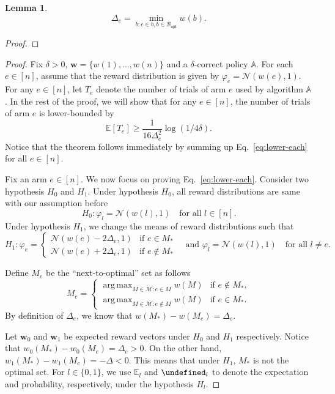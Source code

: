 \documentclass{article}
\newtheorem{lemma}{Lemma}
\newcommand{\Rew}{\varphi}
\newcommand{\E}{\mathbb E}
\newcommand{\M}{\mathcal M}
\newcommand{\Bopt}{\mathcal B_{\mathsf{opt}}}
\DeclareMathOperator*{\argmax}{arg\,max}
\let\Pr\undefined
\DeclareMathOperator{\Pr}{Pr}
\renewcommand{\vec}[1]{\boldsymbol{#1}}
\begin{document}
\begin{spacing}{1.1}
\begin{lemma}
$$
\Delta_e = \min_{b: e \in b, b \in \Bopt} w(b).
$$
\end{lemma}

\begin{proof}
\end{proof}


\begin{proof}
Fix $\delta >0$, $\vec w =\{w(1),\ldots,w(n)\}$ and a $\delta$-correct policy $\mathbb A$.
For each $e\in [n]$, assume that the reward distribution is given by $\Rew_e=\mathcal N(w(e),1)$.
For any $e\in [n]$, let $T_e$ denote the  number of trials of arm $e$ used by algorithm $\mathbb A$.
In the rest of the proof, we will show that for any $e\in [n]$, the number of trials of arm $e$ is lower-bounded by
\begin{equation}
\E[T_e] \ge \frac{1}{16\Delta_e^2}\log(1/4\delta).
\label{eq:lower-each}
\end{equation}
Notice that the theorem follows immediately by summing up Eq.~\eqref{eq:lower-each} for all $e\in[n]$.


Fix an arm $e\in [n]$. We now focus on proving Eq.~\eqref{eq:lower-each}.
Consider two hypothesis $H_0$ and $H_1$. 
Under hypothesis $H_0$, all reward distributions are same with our assumption before
$$
H_0: \Rew_l = \mathcal N(w(l),1) \quad \text{for all } l \in [n].
$$
Under hypothesis $H_1$, we change the means of reward distributions such that 
$$
H_1: 
	\Rew_e = \begin{cases}
	\mathcal N(w(e)-2\Delta_e,1) & \text{if } e\in M_*\\
	\mathcal N(w(e)+2\Delta_e,1) & \text{if } e\not\in M_*
\end{cases} 
\quad\text{and } \Rew_l=\mathcal N(w(l), 1) \quad\text{for all } l\not = e.
$$

Define $M_e$ be the ``next-to-optimal'' set as follows 
$$
M_e = \begin{cases}
		 \argmax_{M\in \M: e \in M} w(M) & \text{if } e\not \in M_*, \\
	     \argmax_{M\in \M: e \not\in M} w(M) & \text{if } e\in M_*.
	  \end{cases}
$$
By definition of $\Delta_e$, we know that $w(M_*)-w(M_e)=\Delta_e$.

Let $\vec w_0$ and $\vec w_1$ be expected reward vectors under $H_0$ and $H_1$ respectively.
Notice that $w_0(M_*)-w_0(M_e)=\Delta_e > 0$.
On the other hand, 
$w_1(M_*)-w_1(M_e) = -\Delta < 0$.
This means that under $H_1$, $M_*$ is not the optimal set.
For $l\in \{0,1\}$, we use $\E_l$ and $\Pr_l$ to denote the expectation and probability, respectively, under the hypothesis $H_l$.


\end{proof}
\end{spacing}
\end{document}
